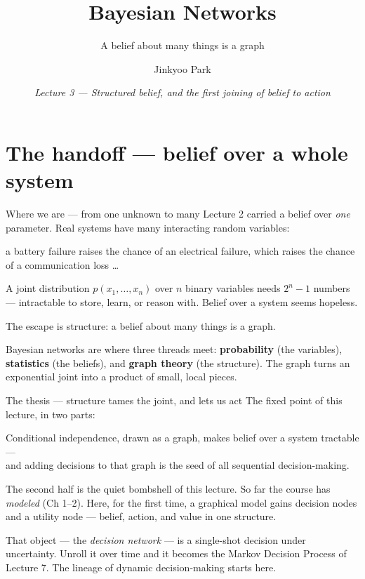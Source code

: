 \documentclass[10pt, aspectratio=169]{beamer}
\title{Bayesian Networks}
\subtitle{A belief about many things is a graph}
\author{Jinkyoo Park}
\institute{KAIST}
\date{\textit{Lecture 3 --- Structured belief, and the first joining of belief to action}}
\begin{document}
\maketitle

\section{The handoff --- belief over a whole system}

\begin{frame}{Where we are --- from one unknown to many}
\vspace{2pt}
Lecture 2 carried a belief over \emph{one} parameter. Real systems have \alert{many interacting random variables}:
\begin{center}\footnotesize
a battery failure raises the chance of an electrical failure, which raises the chance of a communication loss \dots
\end{center}
\medskip

\pause
A joint distribution $p(x_1,\dots,x_n)$ over $n$ binary variables needs $2^n - 1$ numbers --- intractable to store, learn, or reason with. Belief over a system seems hopeless.
\medskip

\pause
\begin{center}\large
\alert{The escape is structure: a belief about many things is a graph.}
\end{center}
\medskip
\pause
Bayesian networks are where three threads meet: \textbf{probability} (the variables), \textbf{statistics} (the beliefs), and \textbf{graph theory} (the structure). The graph turns an exponential joint into a product of small, local pieces.
\end{frame}

\begin{frame}{The thesis --- structure tames the joint, and lets us act}
The fixed point of this lecture, in two parts:
\begin{center}\large
\alert{Conditional independence, drawn as a graph, makes belief over a system tractable ---}\\[2pt]
\alert{and adding decisions to that graph is the seed of all sequential decision-making.}
\end{center}
\medskip

\pause
The second half is the quiet bombshell of this lecture. So far the course has \emph{modeled} (Ch 1--2). Here, for the first time, a graphical model gains \alert{decision nodes and a utility node} --- belief, action, and value in one structure.
\medskip

\pause
That object --- the \emph{decision network} --- is a single-shot decision under uncertainty. Unroll it over time and it becomes the Markov Decision Process of Lecture 7. The lineage of dynamic decision-making starts here.
\end{frame}
\end{document}

